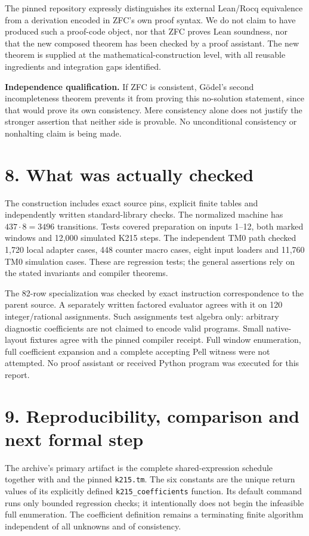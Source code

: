 \documentclass[10pt]{article}
\newcommand{\code}[1]{\texttt{#1}}
\begin{document}
The pinned repository expressly distinguishes its external Lean/Rocq equivalence from a derivation encoded in ZFC's own proof syntax. We do not claim to have produced such a proof-code object, nor that ZFC proves Lean soundness, nor that the new composed theorem has been checked by a proof assistant. The new theorem is supplied at the mathematical-construction level, with all reusable ingredients and integration gaps identified.

\textbf{Independence qualification.} If ZFC is consistent, G\"odel's second incompleteness theorem prevents it from proving this no-solution statement, since that would prove its own consistency. Mere consistency alone does not justify the stronger assertion that neither side is provable. No unconditional consistency or nonhalting claim is being made.

\section*{8. What was actually checked}
The construction includes exact source pins, explicit finite tables and independently written standard-library checks. The normalized machine has $437\cdot8=3496$ transitions. Tests covered preparation on inputs 1--12, both marked windows and 12,000 simulated K215 steps. The independent TM0 path checked 1,720 local adapter cases, 448 counter macro cases, eight input loaders and 11,760 TM0 simulation cases. These are regression tests; the general assertions rely on the stated invariants and compiler theorems.

The 82-row specialization was checked by exact instruction correspondence to the parent source. A separately written factored evaluator agrees with it on 120 integer/rational assignments. Such assignments test algebra only: arbitrary diagnostic coefficients are not claimed to encode valid programs. Small native-layout fixtures agree with the pinned compiler receipt. Full window enumeration, full coefficient expansion and a complete accepting Pell witness were not attempted. No proof assistant or received Python program was executed for this report.
\newpage
\section*{9. Reproducibility, comparison and next formal step}
The archive's primary artifact is the complete shared-expression schedule together with  and the pinned \code{k215.tm}. The six constants are the unique return values of its explicitly defined \code{k215\_coefficients} function. Its default command runs only bounded regression checks; it intentionally does not begin the infeasible full enumeration. The coefficient definition remains a terminating finite algorithm independent of all unknowns and of consistency.
\end{document}
